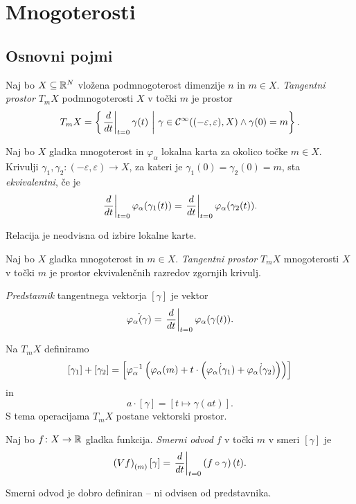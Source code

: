 \section{Mnogoterosti}

\subsection{Osnovni pojmi}


\begin{definicija}
Naj bo $X \subseteq \mathbb{R}^N$ vložena podmnogoterost dimenzije $n$ in
$m \in X$. \emph{Tangentni prostor}
$T_m X$ podmnogoterosti $X$ v točki $m$ je prostor
\[
T_m X =
\left\{\left. \frac{d}{dt}\right|_{t=0}^{} \gamma(t)~\middle\vert~\gamma \in \mathcal{C}^\infty((-\varepsilon, \varepsilon), X)
\land
\gamma(0) = m\right\}.
\]
\end{definicija}

\begin{definicija}
Naj bo $X$ gladka mnogoterost in $\varphi_\alpha$ lokalna karta za
okolico točke $m \in X$. Krivulji
$\gamma_1, \gamma_2 \colon (-\varepsilon, \varepsilon) \to X$, za
kateri je $\gamma_1(0) = \gamma_2(0) = m$, sta \emph{ekvivalentni},
če je
\[
\left. \frac{d}{dt}\right|_{t=0}^{} \varphi_\alpha(\gamma_1(t)) =
\left. \frac{d}{dt}\right|_{t=0}^{} \varphi_\alpha(\gamma_2(t)).
\]
\end{definicija}

\begin{opomba}
Relacija je neodvisna od izbire lokalne karte.
\end{opomba}

\begin{definicija}
Naj bo $X$ gladka mnogoterost in $m \in X$.
\emph{Tangentni prostor} $T_m X$
mnogoterosti $X$ v točki $m$ je prostor ekvivalenčnih razredov
zgornjih krivulj.
\end{definicija}

\begin{definicija}
\emph{Predstavnik}
tangentnega vektorja $[\gamma]$ je vektor
\[
\dot{\varphi_\alpha(\gamma)} =
\left. \frac{d}{dt}\right|_{t=0}^{} \varphi_\alpha(\gamma(t)).
\]
\end{definicija}

\begin{definicija}
Na $T_m X$ definiramo
\[
[\gamma_1] + [\gamma_2] =
\left[
\varphi_\alpha^{-1} \left(\varphi_\alpha(m) + t \cdot
\left(\dot{\varphi_\alpha(\gamma_1)} +
\dot{\varphi_\alpha(\gamma_2)}\right)\right)
\right]
\]
in
\[
a \cdot [\gamma] = [t \mapsto \gamma(at)].
\]
S tema operacijama $T_m X$ postane vektorski prostor.
\end{definicija}

\begin{definicija}
Naj bo $f \colon X \to \mathbb{R}$ gladka funkcija.
\emph{Smerni odvod} $f$ v točki $m$ v smeri
$[\gamma]$ je
\[
\left(Vf\right)_{(m)} [\gamma] =
\left. \frac{d}{dt}\right|_{t=0}^{} \left(f \circ \gamma\right)(t).
\]
\end{definicija}

\begin{opomba}
Smerni odvod je dobro definiran -- ni odvisen od predstavnika.
\end{opomba}
